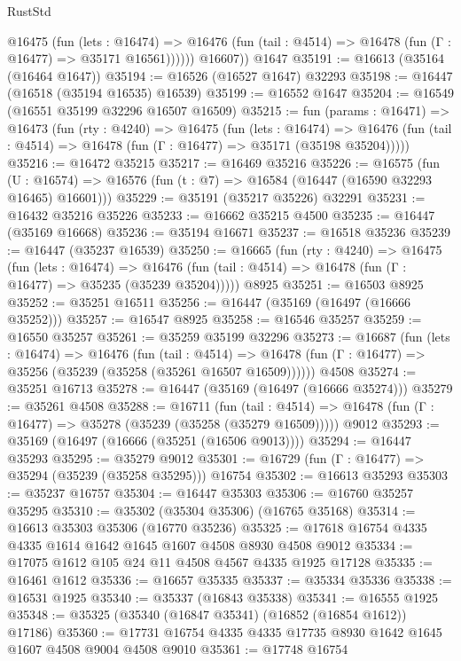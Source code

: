 \begin{lexlean}{RustStd}
\begin{coremodule}
{\begin{coremodule}
{{{{{{{{{{{{{{{{{{{{{{{{{{{{{{{{{{{{{{{{{{{{{{{{{{{{{{{            @16475
              (fun (lets : @16474) =>
              @16476 (fun (tail : @4514) => @16478 (fun (Γ : @16477) => @35171 @16561))))))
        @16607))
    @1647
@35191 := @16613 (@35164 (@16464 @1647))
@35194 := @16526 (@16527 @1647) @32293
@35198 := @16447 (@16518 (@35194 @16535) @16539)
@35199 := @16552 @1647
@35204 := @16549 (@16551 @35199 @32296 @16507 @16509)
@35215 := fun (params : @16471) =>
  @16473
    (fun (rty : @4240) =>
    @16475
      (fun (lets : @16474) =>
      @16476 (fun (tail : @4514) => @16478 (fun (Γ : @16477) => @35171 (@35198 @35204)))))
@35216 := @16472 @35215
@35217 := @16469 @35216
@35226 := @16575
    (fun (U : @16574) => @16576 (fun (t : @7) => @16584 (@16447 (@16590 @32293 @16465) @16601)))
@35229 := @35191 (@35217 @35226) @32291
@35231 := @16432 @35216 @35226
@35233 := @16662 @35215 @4500
@35235 := @16447 (@35169 @16668)
@35236 := @35194 @16671
@35237 := @16518 @35236
@35239 := @16447 (@35237 @16539)
@35250 := @16665
    (fun (rty : @4240) =>
    @16475
      (fun (lets : @16474) =>
      @16476 (fun (tail : @4514) => @16478 (fun (Γ : @16477) => @35235 (@35239 @35204)))))
    @8925
@35251 := @16503 @8925
@35252 := @35251 @16511
@35256 := @16447 (@35169 (@16497 (@16666 @35252)))
@35257 := @16547 @8925
@35258 := @16546 @35257
@35259 := @16550 @35257
@35261 := @35259 @35199 @32296
@35273 := @16687
    (fun (lets : @16474) =>
    @16476
      (fun (tail : @4514) =>
      @16478 (fun (Γ : @16477) => @35256 (@35239 (@35258 (@35261 @16507 @16509))))))
    @4508
@35274 := @35251 @16713
@35278 := @16447 (@35169 (@16497 (@16666 @35274)))
@35279 := @35261 @4508
@35288 := @16711
    (fun (tail : @4514) => @16478 (fun (Γ : @16477) => @35278 (@35239 (@35258 (@35279 @16509)))))
    @9012
@35293 := @35169 (@16497 (@16666 (@35251 (@16506 @9013))))
@35294 := @16447 @35293
@35295 := @35279 @9012
@35301 := @16729 (fun (Γ : @16477) => @35294 (@35239 (@35258 @35295))) @16754
@35302 := @16613 @35293
@35303 := @35237 @16757
@35304 := @16447 @35303
@35306 := @16760 @35257 @35295
@35310 := @35302 (@35304 @35306) (@16765 @35168)
@35314 := @16613 @35303 @35306 (@16770 @35236)
@35325 := @17618 @16754 @4335 @4335 @1614 @1642 @1645 @1607 @4508 @8930 @4508 @9012
@35334 := @17075 @1612 @105 @24 @11 @4508 @4567 @4335 @1925 @17128
@35335 := @16461 @1612
@35336 := @16657 @35335
@35337 := @35334 @35336
@35338 := @16531 @1925
@35340 := @35337 (@16843 @35338)
@35341 := @16555 @1925
@35348 := @35325 (@35340 (@16847 @35341) (@16852 (@16854 @1612)) @17186)
@35360 := @17731 @16754 @4335 @4335 @17735 @8930 @1642 @1645 @1607 @4508 @9004 @4508 @9010
@35361 := @17748 @16754
}}}}}}}}}}}}}}}}}}}}}}}}}}}}}}}}}}}}}}}}}}}}}}}}}}}}}}}
\end{coremodule}}
\end{coremodule}
\end{lexlean}
